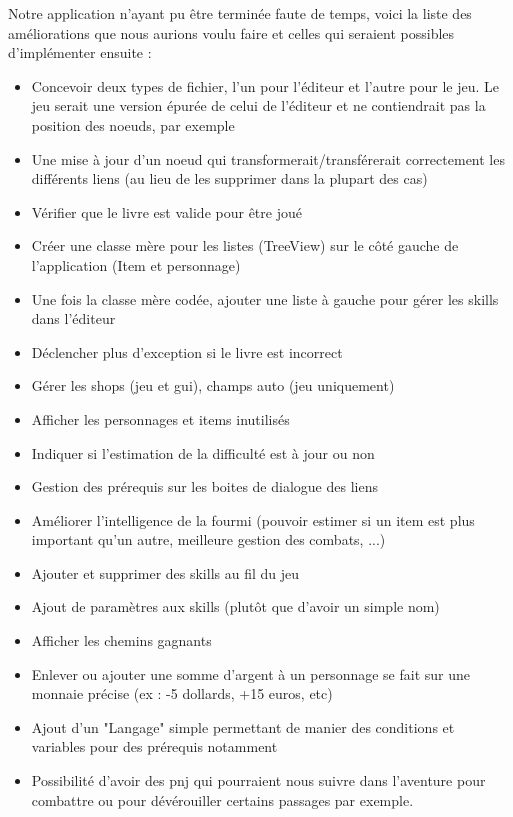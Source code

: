 		Notre application n'ayant pu être terminée faute de temps, voici la liste des améliorations que nous aurions voulu faire et celles qui seraient possibles d'implémenter ensuite :

		\begin{itemize}
			\item{Concevoir deux types de fichier, l'un pour l'éditeur et l'autre pour le jeu. Le jeu serait une version épurée de celui de l'éditeur et ne contiendrait pas la position des noeuds, par exemple}
			\item{Une mise à jour d'un noeud qui transformerait/transférerait correctement les différents liens (au lieu de les supprimer dans la plupart des cas)}
			\item{Vérifier que le livre est valide pour être joué}
			\item{Créer une classe mère pour les listes (TreeView) sur le côté gauche de l'application (Item et personnage)}
			\item{Une fois la classe mère codée, ajouter une liste à gauche pour gérer les skills dans l'éditeur}
			\item{Déclencher plus d'exception si le livre est incorrect}
			\item{Gérer les shops (jeu et gui), champs auto (jeu uniquement)}
			\item{Afficher les personnages et items inutilisés}
			\item{Indiquer si l'estimation de la difficulté est à jour ou non}
			\item{Gestion des prérequis sur les boites de dialogue des liens}
			\item{Améliorer l'intelligence de la fourmi (pouvoir estimer si un item est plus important qu'un autre, meilleure gestion des combats, ...)}
			\item{Ajouter et supprimer des skills au fil du jeu}
			\item{Ajout de paramètres aux skills (plutôt que d'avoir un simple nom)}
			\item{Afficher les chemins gagnants}
			\item{Enlever ou ajouter une somme d'argent à un personnage se fait sur une monnaie précise (ex : -5 dollards, +15 euros, etc)}
			\item{Ajout d'un "Langage" simple permettant de manier des conditions et variables pour des prérequis notamment}
			\item{Possibilité d'avoir des pnj qui pourraient nous suivre dans l'aventure pour combattre ou pour dévérouiller certains passages par exemple.}
		\end{itemize}

